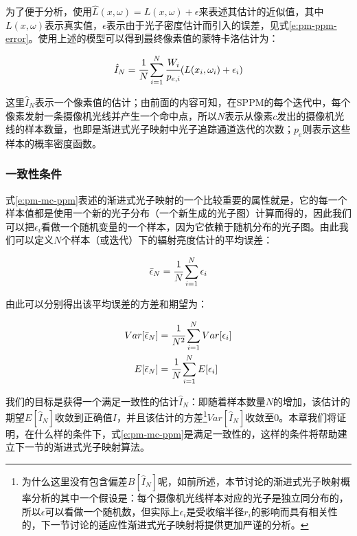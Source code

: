 为了便于分析，\cite{a:ProgressivePhotonMappingAProbabilisticApproach}使用$\hat{L}(x,\omega)=L(x,\omega)+\epsilon$来表述其估计的近似值，其中$L(x,\omega)$表示真实值，$\epsilon$表示由于光子密度估计而引入的误差，见式\ref{e:pm-ppm-error}。使用上述的模型可以得到最终像素值的蒙特卡洛估计为：

\begin{equation}\label{e:pm-mc-ppm}
	\hat{I}_N= \cfrac{1}{N}\sum^{N}_{i=1} \cfrac{W_i}{p_{e,i}}(L(x_i,\omega_i)+\epsilon_i)
\end{equation}

\noindent 这里$\hat{I}_N$表示一个像素值的估计；由前面的内容可知，在SPPM的每个迭代中，每个像素发射一条摄像机光线并产生一个命中点，所以$N$表示从像素$c$发出的摄像机光线的样本数量，也即是渐进式光子映射中光子追踪通道迭代的次数；$p_e$则表示这些样本的概率密度函数。




\subsubsection{一致性条件}\label{sec:pm-pppm-convergence}
式\ref{e:pm-mc-ppm}表述的渐进式光子映射的一个比较重要的属性就是，它的每一个样本值都是使用一个新的光子分布（一个新生成的光子图）计算而得的，因此我们可以把$\epsilon_i$看做一个随机变量的一个样本，因为它依赖于随机分布的光子图。由此我们可以定义$N$个样本（或迭代）下的辐射亮度估计的平均误差：

\begin{equation}
	\bar{\epsilon}_N= \cfrac{1}{N}\sum^{N}_{i=1}\epsilon_i
\end{equation}

\noindent 由此可以分别得出该平均误差的方差和期望为：

\begin{equation}
\begin{aligned}
	Var[\bar{\epsilon}_N]&= \cfrac{1}{N^{2}}\sum^{N}_{i=1}Var[\epsilon_i]\\
	E[\bar{\epsilon}_N]&= \cfrac{1}{N}\sum^{N}_{i=1}E[\epsilon_i]
\end{aligned}
\end{equation}

我们的目标是获得一个满足一致性的估计$\hat{I}_N$：即随着样本数量$N$的增加，该估计的期望$E[\hat{I}_N]$收敛到正确值$I$，并且该估计的方差\footnote{为什么这里没有包含偏差$B[\hat{I}_N]$呢，如前所述，本节讨论的渐进式光子映射概率分析的其中一个假设是：每个摄像机光线样本对应的光子是独立同分布的，所以$\epsilon$可以看做一个随机数，但实际上$\epsilon_i$是受收缩半径$r_i$的影响而具有相关性的，下一节讨论的适应性渐进式光子映射将提供更加严谨的分析。}$Var[\hat{I}_N]$收敛至0。本章我们将证明，在什么样的条件下，式\ref{e:pm-mc-ppm}是满足一致性的，这样的条件将帮助建立下一节的渐进式光子映射算法。

